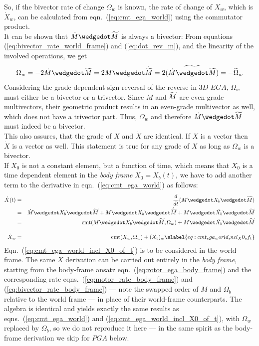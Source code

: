 So, if the bivector rate of change $\Omega_w$ is known, the rate of change of $X_w$, which
is $\dot{X}_w$, can be calculated from eqn.~(\ref{eq:cmt_ega_world}) using the commutator
product. \\

It can be shown that $\dot{M} \wedgedot \rev{M}$ is always a bivector: From equations
(\ref{eq:bivector_rate_world_frame}) and (\ref{eq:dot_rev_m}), and the linearity of the
involved operations, we get
\begin{equation}
   \Omega_w = -2 \dot{M} \wedgedot \rev{M} = 2 M \wedgedot
   \dot{\rev{M}} = 2 (\rev{\dot{M}\wedgedot\rev{M}})= -\rev{\Omega}_w
   \label{eq:bivector_poof_gpr}
\end{equation}
Considering the grade-dependent sign-reversal of the reverse in $3D$ $EGA$, $\Omega_w$
must either be a bivector or a trivector. Since $\dot{M}$ and $\widetilde{M}$ are even-grade
multivectors, their geometric product results in an even-grade multivector as well, which
does not have a trivector part. Thus, $\Omega_w$ and therefore $\dot{M} \wedgedot \rev{M}$
must indeed be a bivector. \\

This also assures, that the grade of $X$ and $\dot{X}$ are identical. If $X$ is a vector
then $\dot{X}$ is a vector as well. This statement is true for any grade of $X$ as long as
$\Omega_w$ is a bivector. \\

If $X_0$ is not a constant element, but a function of time, which means that $X_0$ is a
time dependent element in the \emph{body frame} $X_0 = X_b(t)$, we have to add another
term to the derivative in eqn.~(\ref{eq:cmt_ega_world}) as follows:
\begin{eqnarray}
   \dot{X}(t) &=& \frac{d}{dt}(M \wedgedot X_b \wedgedot \rev{M}) \nonumber \\
              &=& \dot{M} \wedgedot X_b \wedgedot \rev{M} + M \wedgedot X_b \wedgedot
                  \dot{\rev{M}} + M \wedgedot \dot{X_b} \wedgedot \rev{M} \nonumber \\
              &=& \mathrm{cmt}(M\wedgedot X_b \wedgedot\rev{M},\Omega_w)
                   + M \wedgedot \dot{X_b} \wedgedot \rev{M} \nonumber \\[10 pt]
   \dot{X}_w  &=& \mathrm{cmt}(X_w,\Omega_w) + (\dot{X_b})_w
   \slabel{eq:cmt_ega_world_incl_X0_of_t}
\end{eqnarray}
Eqn.~(\ref{eq:cmt_ega_world_incl_X0_of_t}) is to be considered in the world frame. The
same $\dot{X}$ derivation can be carried out entirely in the \emph{body frame}, starting
from the body-frame ansatz eqn.~(\ref{eq:rotor_ega_body_frame}) and the corresponding
rate eqns.~(\ref{eq:motor_rate_body_frame}) and (\ref{eq:bivector_rate_body_frame}) ---
note the swapped order of $M$ and $\Omega_b$ relative to the world frame --- in place of
their world-frame counterparts. The algebra is identical and yields exactly the same
results as eqns.~(\ref{eq:cmt_ega_world}) and (\ref{eq:cmt_ega_world_incl_X0_of_t}), with
$\Omega_w$ replaced by $\Omega_b$, so we do not reproduce it here --- in the same spirit
as the body-frame derivation we skip for $PGA$ below. \\

